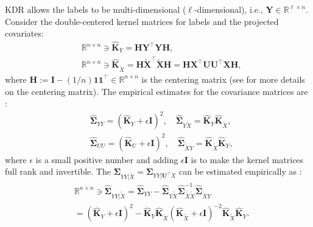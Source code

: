 \documentclass[lang=cn,10pt]{gorgeousnbook}
\numberwithin{equation}{section}%
\numberwithin{figure}{section}%
\begin{document}
KDR allows the labels to be multi-dimensional ($\ell$-dimensional), i.e., $\boldsymbol{Y} \in \mathbb{R}^{\ell \times n}$.
Consider the double-centered kernel matrices for labels and the projected covariates:
\begin{align}
&\mathbb{R}^{n \times n} \ni \widehat{\boldsymbol{K}}_Y = \boldsymbol{H} \boldsymbol{Y}^\top \boldsymbol{Y} \boldsymbol{H}, \\
&\mathbb{R}^{n \times n} \ni \widehat{\boldsymbol{K}}_{\widetilde{X}} = \boldsymbol{H} \widetilde{\boldsymbol{X}}^\top \widetilde{\boldsymbol{X}} \boldsymbol{H} = \boldsymbol{H} \boldsymbol{X}^\top \boldsymbol{U} \boldsymbol{U}^\top \boldsymbol{X} \boldsymbol{H}, \label{equation_KDR_kernel_projected_X_centered}
\end{align}
where $\boldsymbol{H} := \boldsymbol{I} - (1/n) \boldsymbol{1}\boldsymbol{1}^\top \in \mathbb{R}^{n \times n}$ is the centering matrix (see \cite{ghojogh2019unsupervised,ghojogh2021reproducing} for more details on the centering matrix).
The empirical estimates for the covariance matrices are \cite{fukumizu2003kernel}:
\begin{align*}
& \widehat{\boldsymbol{\Sigma}}_{YY} = (\widehat{\boldsymbol{K}}_Y + \epsilon \boldsymbol{I})^2, \quad \widehat{\boldsymbol{\Sigma}}_{Y\widetilde{X}} = \widehat{\boldsymbol{K}}_Y \widehat{\boldsymbol{K}}_{\widetilde{X}}, \\
& \widehat{\boldsymbol{\Sigma}}_{UU} = (\widehat{\boldsymbol{K}}_U + \epsilon \boldsymbol{I})^2, \quad \widehat{\boldsymbol{\Sigma}}_{\widetilde{X}Y} = \widehat{\boldsymbol{K}}_{\widetilde{X}} \widehat{\boldsymbol{K}}_Y,
\end{align*}
where $\epsilon$ is a small positive number and adding $\epsilon \boldsymbol{I}$ is to make the kernel matrices full rank and invertible. 
The $\boldsymbol{\Sigma}_{YY|\widetilde{X}} = \boldsymbol{\Sigma}_{YY|\boldsymbol{U}^\top X}$ can be estimated empirically as \cite{fukumizu2003kernel}:
\begin{equation}\label{equation_KDR_Cov_YY_X_tilde}
\begin{aligned}
&\mathbb{R}^{n \times n} \ni \widehat{\boldsymbol{\Sigma}}_{YY|\widetilde{X}} = \widehat{\boldsymbol{\Sigma}}_{YY} - \widehat{\boldsymbol{\Sigma}}_{Y\widetilde{X}} \widehat{\boldsymbol{\Sigma}}_{\widetilde{X}\widetilde{X}}^{-1} \widehat{\boldsymbol{\Sigma}}_{\widetilde{X}Y} \\
&= (\widehat{\boldsymbol{K}}_Y + \epsilon \boldsymbol{I})^2 - \widehat{\boldsymbol{K}}_Y \widehat{\boldsymbol{K}}_{\widetilde{X}} (\widehat{\boldsymbol{K}}_{\widetilde{X}} + \epsilon \boldsymbol{I})^{-2} \widehat{\boldsymbol{K}}_{\widetilde{X}} \widehat{\boldsymbol{K}}_Y.
\end{aligned}
\end{equation}
\end{document}
